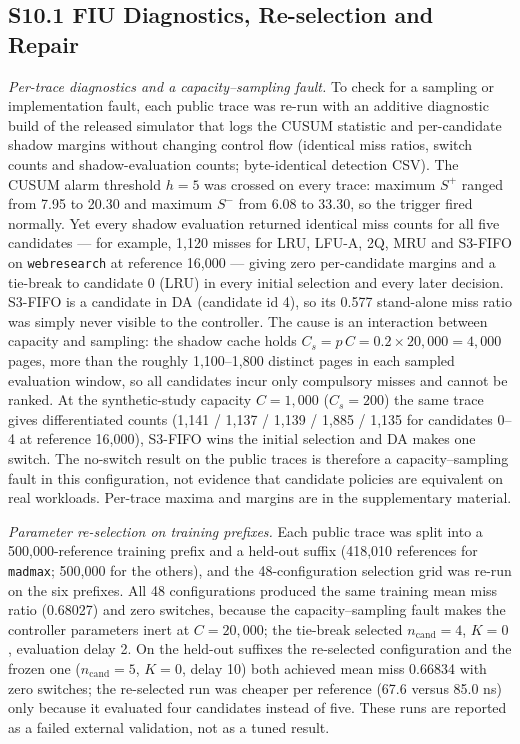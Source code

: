 \documentclass[journal,onecolumn]{IEEEtran}
\begin{document}
\subsection*{S10.1 FIU Diagnostics, Re-selection and Repair}
\emph{Per-trace diagnostics and a capacity--sampling fault.} To check for a
sampling or implementation fault, each public trace was re-run with an
additive diagnostic build of the released simulator that logs the CUSUM
statistic and per-candidate shadow margins without changing control flow
(identical miss ratios, switch counts and shadow-evaluation counts; byte-identical
detection CSV). The CUSUM alarm threshold $h = 5$ was crossed on every trace:
maximum $S^+$ ranged from 7.95 to 20.30 and maximum $S^-$ from 6.08 to 33.30,
so the trigger fired normally. Yet every shadow evaluation returned identical
miss counts for all five candidates --- for example, 1,120 misses for LRU,
LFU-A, 2Q, MRU and S3-FIFO on \texttt{webresearch} at reference 16,000 --- giving
zero per-candidate margins and a tie-break to candidate 0 (LRU) in every
initial selection and every later decision. S3-FIFO is a candidate in DA
(candidate id 4), so its 0.577 stand-alone miss ratio was simply never visible
to the controller. The cause is an interaction between capacity and sampling:
the shadow cache holds $C_s = p\,C = 0.2 \times 20{,}000 = 4{,}000$ pages, more
than the roughly 1,100--1,800 distinct pages in each sampled evaluation window,
so all candidates incur only compulsory misses and cannot be ranked. At the
synthetic-study capacity $C = 1{,}000$ ($C_s = 200$) the same trace gives
differentiated counts (1,141 / 1,137 / 1,139 / 1,885 / 1,135 for candidates
0--4 at reference 16,000), S3-FIFO wins the initial selection and DA makes one
switch. The no-switch result on the public traces is therefore a
capacity--sampling fault in this configuration, not evidence that candidate
policies are equivalent on real workloads. Per-trace maxima and margins are in
the supplementary material.

\emph{Parameter re-selection on training prefixes.} Each public trace was split
into a 500,000-reference training prefix and a held-out suffix (418,010
references for \texttt{madmax}; 500,000 for the others), and the 48-configuration
selection grid was re-run on the six prefixes. All 48 configurations produced
the same training mean miss ratio (0.68027) and zero switches, because the
capacity--sampling fault makes the controller parameters inert at $C = 20{,}000$;
the tie-break selected $n_{\mathrm{cand}} = 4$, $K = 0$, evaluation delay 2. On
the held-out suffixes the re-selected configuration and the frozen one
($n_{\mathrm{cand}} = 5$, $K = 0$, delay 10) both achieved mean miss 0.66834 with
zero switches; the re-selected run was cheaper per reference (67.6 versus 85.0
ns) only because it evaluated four candidates instead of five. These runs are
reported as a failed external validation, not as a tuned result.
\end{document}
